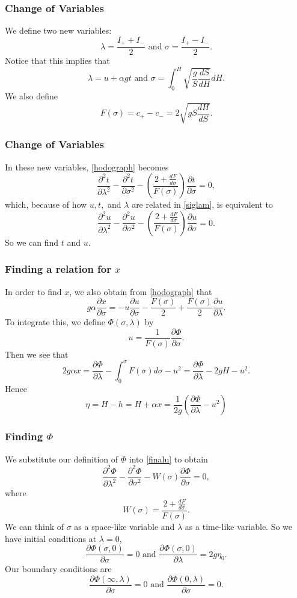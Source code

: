 \begin{frame}
\frametitle{Change of Variables}
We define two new variables:
\[
\lambda = \frac{I_+ + I_-}{2} \text{ and } \sigma = \frac{I_+ - I_-}{2}.
\]
Notice that this implies that
\begin{equation} \label{siglam}
\lambda = u + \alpha g t \text{ and } \sigma = \int_0^H \sqrt{\frac{g}{S} \frac{dS}{dH}}dH.
\end{equation}
We also define
\[
F(\sigma) = c_+ - c_- = 2 \sqrt{gS \frac{dH}{dS}}.
\]
\end{frame}

\begin{frame}
\frametitle{Change of Variables}
In these new variables, \eqref{hodograph} becomes
\[
\frac{\partial^2 t}{\partial \lambda^2} - \frac{\partial^2 t}{\partial \sigma^2} - \left( \frac{2 + \frac{dF}{d\sigma}}{F(\sigma)} \right) \frac{\partial t}{\partial \sigma} = 0,
\]
which, because of how $u,t,$ and $\lambda$ are related in \eqref{siglam}, is equivalent to
\begin{equation}\label{finalu}
\frac{\partial^2 u}{\partial \lambda^2} - \frac{\partial^2 u}{\partial \sigma^2} - \left( \frac{2 + \frac{dF}{d\sigma}}{F(\sigma)} \right) \frac{\partial u}{\partial \sigma} = 0.
\end{equation}
So we can find $t$ and $u$.
\end{frame}

\begin{frame}
\frametitle{Finding a relation for $x$}
In order to find $x$, we also obtain from \eqref{hodograph} that
\[
g \alpha \frac{\partial x}{\partial \sigma} = - u \frac{\partial u}{\partial \sigma} - \frac{F(\sigma)}{2} + \frac{F(\sigma)}{2} \frac{\partial u}{\partial \lambda}.
\]
To integrate this, we define $\Phi(\sigma,\lambda)$ by
\[
u = \frac{1}{F(\sigma)} \frac{\partial \Phi}{\partial \sigma}.
\]
Then we see that
\[
2 g \alpha x = \frac{\partial \Phi}{\partial \lambda} - \int_0^\sigma F(\sigma) d\sigma - u^2 = \frac{\partial \Phi}{\partial \lambda} - 2gH - u^2.
\]
Hence
\[
\eta = H - h = H + \alpha x = \frac{1}{2g} \left(\frac{\partial \Phi}{\partial \lambda} - u^2 \right)
\]
\end{frame}

\begin{frame}
\frametitle{Finding $\Phi$}
We substitute our definition of $\Phi$ into \eqref{finalu} to obtain
\begin{equation}\label{Phieq}
\frac{\partial^2 \Phi}{\partial \lambda^2} - \frac{\partial^2 \Phi}{\partial \sigma^2} - W(\sigma) \frac{\partial \Phi}{\partial \sigma} = 0,
\end{equation}
where
\[
W(\sigma) = \frac{2 + \frac{dF}{d\sigma}}{F(\sigma)}.
\]
We can think of $\sigma$ as a space-like variable and $\lambda$ as a time-like variable. So we have initial conditions at $\lambda = 0$,
\[
\frac{\partial \Phi(\sigma,0)}{\partial \sigma} = 0 \text{ and } \frac{\partial \Phi(\sigma,0)}{\partial \lambda} = 2g\eta_0.
\]
Our boundary conditions are
\[
\frac{\partial \Phi(\infty,\lambda)}{\partial \sigma} = 0 \text{ and } \frac{\partial \Phi(0,\lambda)}{\partial \sigma} = 0.
\]
\end{frame}

